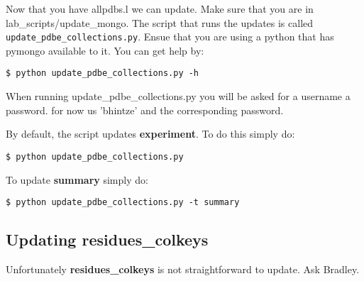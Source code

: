 \documentclass[12pt]{article}
\newcommand{\cmdline}[1]{\vspace{5mm} \noindent
\texttt{\$ #1}
\vspace{5mm}

}
\newcommand{\mdbcol}[1]{{\color{Bittersweet}\textbf{#1}}}
\begin{document}
\noindent
Now that you have allpdbs.l we can update. Make sure that you are in\\lab\_scripts/update\_mongo. The script that runs the updates is called\\ \texttt{update\_pdbe\_collections.py}. Ensue that you are using a python that has pymongo available to it. You can get help by:

\cmdline{python update\_pdbe\_collections.py -h}

\noindent
When running update\_pdbe\_collections.py you will be asked for a username a password. for now us 'bhintze' and the corresponding password.

\vspace{5mm}
\noindent
By default, the script updates \mdbcol{experiment}. To do this simply do:

\cmdline{python update\_pdbe\_collections.py}

\noindent
To update \mdbcol{summary} simply do:

\cmdline{python update\_pdbe\_collections.py -t summary}

\subsection{Updating \mdbcol{residues\_colkeys}}

Unfortunately \mdbcol{residues\_colkeys} is not straightforward to update. Ask Bradley.
\end{document}
